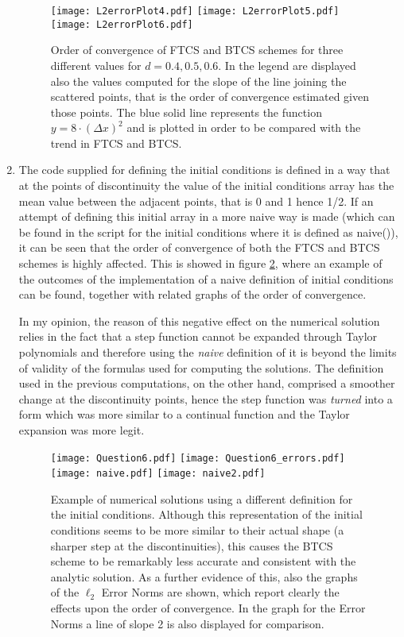 \documentclass[12pt]{article}
\begin{document}
\begin{enumerate}
\begin{figure}[!tbh]
\centering
\texttt{[image: L2errorPlot4.pdf]}
\texttt{[image: L2errorPlot5.pdf]}
\texttt{[image: L2errorPlot6.pdf]}

\caption{Order of convergence of FTCS and BTCS schemes for three different values for $d=0.4, 0.5, 0.6$. In the legend are displayed also the values computed for the slope of the line joining the scattered points, that is the order of convergence estimated given those points. The blue solid line represents the function $y=8\cdot(\Delta x)^2$ and is plotted in order to be compared with the trend in FTCS and BTCS.
\label{fig:Q5}}
\end{figure}

\item The code supplied for defining the initial conditions is defined in a way that at the points of discontinuity the value of the initial conditions array has the mean value between the adjacent points, that is 0 and 1 hence 1/2. If an attempt of defining this initial array in a more naive way is made (which can be found in the script for the initial conditions where it is defined as naive()), it can be seen that the order of convergence of both the FTCS and BTCS schemes is highly affected. This is showed in figure \ref{fig:Q6}, where an example of the outcomes of the implementation of a naive definition of initial conditions can be found, together with related graphs of the order of convergence.\par
In my opinion, the reason of this negative effect on the numerical solution relies in the fact that a step function cannot be expanded through Taylor polynomials and therefore using the \emph{naive} definition of it is beyond the limits of validity of the formulas used for computing the solutions. The definition used in the previous computations, on the other hand, comprised a smoother change at the discontinuity points, hence the step function was \emph{turned} into a form which was more similar to a continual function and the Taylor expansion was more legit.

\begin{figure}[!tbh]
\centering
\texttt{[image: Question6.pdf]}
\texttt{[image: Question6\_errors.pdf]}
\texttt{[image: naive.pdf]}
\texttt{[image: naive2.pdf]}

\caption{Example of numerical solutions using a different definition for the initial conditions. Although this representation of the initial conditions seems to be more similar to their actual shape (a sharper step at the discontinuities), this causes the BTCS scheme to be remarkably less accurate and consistent with the analytic solution. As a further evidence of this, also the graphs of the $\ell_2$ Error Norms are shown, which report clearly the effects upon the order of convergence. In the graph for the Error Norms a line of slope 2 is also displayed for comparison.}
\label{fig:Q6}
\end{figure}


\end{enumerate}
\end{document}
